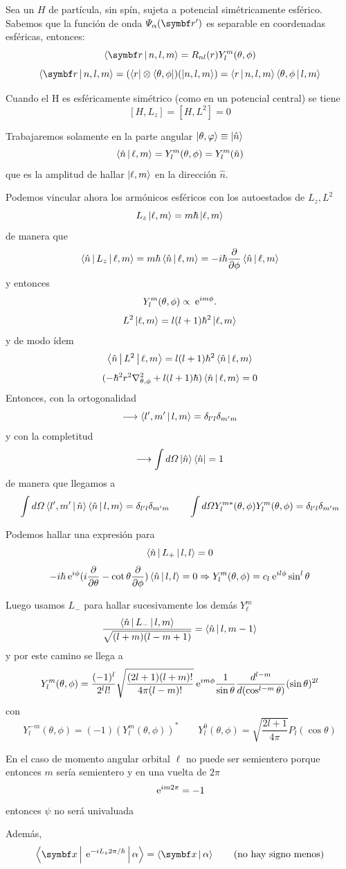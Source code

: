 \documentclass[10pt,oneside]{CBFT_book}
\begin{document}
Sea un $H$ de partícula, sin spín, sujeta a potencial simétricamente esférico. Sabemos que la función de onda 
$\Psi_\alpha(\vb{r}')$ es separable en coordenadas esféricas, entonces:
\[
	\Braket{\vb{r}|n,l,m} = R_{nl}(r)Y_l^m(\theta,\phi)
\]
\[
	\Braket{\vb{r}|n,l,m} = (\Bra{{r}}\otimes\Bra{\theta,\phi})(\Ket{n,l,m})=
	\Braket{r|n,l,m}\Braket{\theta,\phi|l,m}
\]

Cuando el H es esféricamente simétrico (como en un potencial central) se tiene 
\[
	[H,L_z] = [H,L^2] = 0
\]

Trabajaremos solamente en la parte angular  $\Ket{\theta,\varphi} \equiv \Ket{\hat{n}}$
\[
	\Braket{\hat{n}|\ell,m} = Y_l^m(\theta,\phi) = Y_l^m(\hat{n})
\]
que es la amplitud de hallar $\Ket{\ell,m}$ en la dirección $\hat{n}$.

Podemos vincular ahora los armónicos esféricos con los autoestados de $L_z,L^2$
\[
	L_z \Ket{\ell,m} = m\hbar\Ket{\ell,m}
\]
de manera que 
\[
	\Braket{\hat{n}|L_z|\ell,m} = m\hbar \Braket{\hat{n}|\ell,m} =
	-i\hbar \frac{\partial^{\hspace{-0.05em}} {}}{\partial {\phi}^{\hspace{-0.05em}}} \Braket{\hat{n}|\ell,m}
\]
y entonces 
\[
	Y_l^m(\theta,\phi) \propto \:\mathrm{e}^{im\phi}.
\]
\[
	L^2 \Ket{\ell,m} = l(l+1)\hbar^2\Ket{\ell,m}
\]
y de modo ídem
\[
	\Braket{\hat{n}|L^2|\ell,m} = l(l+1)\hbar^2\Braket{\hat{n}|\ell,m}
\]
\[
	( -\hbar^2 r^2 \nabla^2_{\theta,\phi} + l(l+1)\hbar )\Braket{\hat{n}|\ell,m} = 0 
\]
Entonces, con la ortogonalidad
\[
	\longrightarrow \Braket{l',m'|l,m} = \delta_{l'l} \delta_{m'm}
\]
y con la completitud 
\[
	\longrightarrow \int d\Omega \Ket{\hat{n}}\Bra{\hat{n}} = 1
\]
de manera que llegamos a 
\[
	\int d\Omega \Braket{l',m'|\hat{n}} \Braket{\hat{n}|l,m} = \delta_{l'l} \delta_{m'm}   \qquad 
	\int d\Omega Y_l^{m*}(\theta,\phi)  Y_l^m(\theta,\phi)  = \delta_{l'l} \delta_{m'm}
\]

Podemos hallar una expresión para 
\[
	\Braket{\hat{n}|L_+|l,l} = 0
\]
\[
	-i\hbar\:\mathrm{e}^{i\phi}(i\frac{\partial^{\hspace{-0.05em}} {}}{\partial {\theta}^{\hspace{-0.05em}}}-\cot\theta\frac{\partial^{\hspace{-0.05em}} {}}{\partial {\phi}^{\hspace{-0.05em}}})\Braket{\hat{n}|l,l} = 0 \Rightarrow
	Y_l^m(\theta,\phi)  = c_l \:\mathrm{e}^{il\phi}\sin^l\theta
\]

Luego usamos $L_-$ para hallar sucesivamente los demás $Y^m_\ell$
\[
	\frac{\Braket{\hat{n}|L_-|l,m} }{\sqrt{(l+m)(l-m+1)}} = \Braket{\hat{n}|l,m-1} 
\]
y por este camino se llega a 
\[
	Y_l^m(\theta,\phi) = \frac{(-1)^l}{2^ll!}\sqrt{\frac{(2l+1)(l+m)!}{4\pi(l-m)!}} \:\mathrm{e}^{im\phi} 
\frac{1}{\sin\theta}
	\frac{d^{\hspace{-0.05em}} {^{l-m}}}{d {(\cos^{l-m}\theta)}^{\hspace{-0.05em}}}(\sin\theta)^{2l}
\]
con 
\[
	Y_l^{-m}(\theta,\phi) = (-1)( Y_l^m(\theta,\phi) )^* \qquad 
	Y_l^0(\theta,\phi) = \sqrt{\frac{2l+1}{4\pi}}P_l(\cos\theta)
\]

En el caso de momento angular orbital $\ell$ no puede ser semientero porque entonces $m$ sería semientero y 
en una vuelta de $2\pi$
\[
	\:\mathrm{e}^{im2\pi} = -1
\]
entonces $\psi$ no será univaluada

Además,
\[
	\Braket{\vb{x}|\euler^{-iL_z2\pi/\hbar}|\alpha} = \Braket{\vb{x}|\alpha} \qquad \text{(no hay signo menos)}
\]


\end{document}
